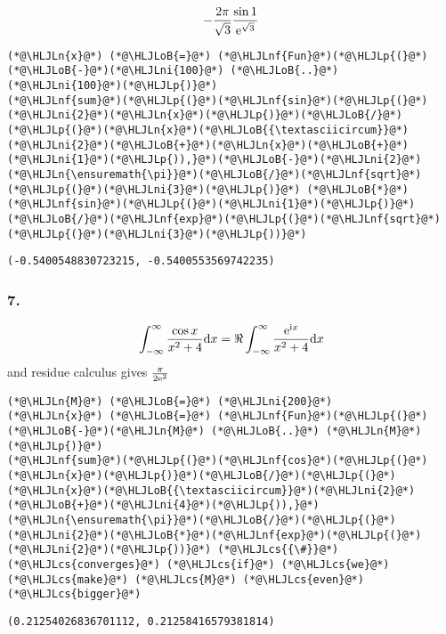 \documentclass[12pt,landscape]{article}
\newcommand{\HLJLn}[1]{#1}
\newcommand{\HLJLnf}[1]{\textcolor[RGB]{66,102,213}{#1}}
\newcommand{\HLJLni}[1]{\textcolor[RGB]{59,151,46}{#1}}
\newcommand{\HLJLoB}[1]{\textcolor[RGB]{102,102,102}{\textbf{#1}}}
\newcommand{\HLJLp}[1]{#1}
\newcommand{\HLJLcs}[1]{\textcolor[RGB]{153,153,119}{\textit{#1}}}
\def\D{ {\rm d} }
\def\I{ {\rm i} }
\def\E{ {\rm e} }
\def\dx{\D x}
\begin{document}
{\[
   -{2 \pi \over \sqrt 3} {\sin 1 \over \E^{\sqrt{3}}}
\]

\begin{lstlisting}
(*@\HLJLn{x}@*) (*@\HLJLoB{=}@*) (*@\HLJLnf{Fun}@*)(*@\HLJLp{(}@*)(*@\HLJLoB{-}@*)(*@\HLJLni{100}@*) (*@\HLJLoB{..}@*) (*@\HLJLni{100}@*)(*@\HLJLp{)}@*)
(*@\HLJLnf{sum}@*)(*@\HLJLp{(}@*)(*@\HLJLnf{sin}@*)(*@\HLJLp{(}@*)(*@\HLJLni{2}@*)(*@\HLJLn{x}@*)(*@\HLJLp{)}@*)(*@\HLJLoB{/}@*)(*@\HLJLp{(}@*)(*@\HLJLn{x}@*)(*@\HLJLoB{{\textasciicircum}}@*)(*@\HLJLni{2}@*)(*@\HLJLoB{+}@*)(*@\HLJLn{x}@*)(*@\HLJLoB{+}@*)(*@\HLJLni{1}@*)(*@\HLJLp{)),}@*)(*@\HLJLoB{-}@*)(*@\HLJLni{2}@*)(*@\HLJLn{\ensuremath{\pi}}@*)(*@\HLJLoB{/}@*)(*@\HLJLnf{sqrt}@*)(*@\HLJLp{(}@*)(*@\HLJLni{3}@*)(*@\HLJLp{)}@*) (*@\HLJLoB{*}@*) (*@\HLJLnf{sin}@*)(*@\HLJLp{(}@*)(*@\HLJLni{1}@*)(*@\HLJLp{)}@*)(*@\HLJLoB{/}@*)(*@\HLJLnf{exp}@*)(*@\HLJLp{(}@*)(*@\HLJLnf{sqrt}@*)(*@\HLJLp{(}@*)(*@\HLJLni{3}@*)(*@\HLJLp{))}@*)
\end{lstlisting}

\begin{lstlisting}
(-0.5400548830723215, -0.5400553569742235)
\end{lstlisting}


\subsubsection{7.}
\[
	\int_{-\infty}^\infty    {\cos x \over x^2 + 4} \dx = \Re 	\int_{-\infty}^\infty    {\E^{\I x}\over x^2 + 4} \dx
\]
and residue calculus gives ${\pi \over 2 \E^2}$


\begin{lstlisting}
(*@\HLJLn{M}@*) (*@\HLJLoB{=}@*) (*@\HLJLni{200}@*)
(*@\HLJLn{x}@*) (*@\HLJLoB{=}@*) (*@\HLJLnf{Fun}@*)(*@\HLJLp{(}@*)(*@\HLJLoB{-}@*)(*@\HLJLn{M}@*) (*@\HLJLoB{..}@*) (*@\HLJLn{M}@*)(*@\HLJLp{)}@*)
(*@\HLJLnf{sum}@*)(*@\HLJLp{(}@*)(*@\HLJLnf{cos}@*)(*@\HLJLp{(}@*)(*@\HLJLn{x}@*)(*@\HLJLp{)}@*)(*@\HLJLoB{/}@*)(*@\HLJLp{(}@*)(*@\HLJLn{x}@*)(*@\HLJLoB{{\textasciicircum}}@*)(*@\HLJLni{2}@*)(*@\HLJLoB{+}@*)(*@\HLJLni{4}@*)(*@\HLJLp{)),}@*)(*@\HLJLn{\ensuremath{\pi}}@*)(*@\HLJLoB{/}@*)(*@\HLJLp{(}@*)(*@\HLJLni{2}@*)(*@\HLJLoB{*}@*)(*@\HLJLnf{exp}@*)(*@\HLJLp{(}@*)(*@\HLJLni{2}@*)(*@\HLJLp{))}@*) (*@\HLJLcs{{\#}}@*) (*@\HLJLcs{converges}@*) (*@\HLJLcs{if}@*) (*@\HLJLcs{we}@*) (*@\HLJLcs{make}@*) (*@\HLJLcs{M}@*) (*@\HLJLcs{even}@*) (*@\HLJLcs{bigger}@*)
\end{lstlisting}

\begin{lstlisting}
(0.21254026836701112, 0.21258416579381814)
\end{lstlisting}


}
\end{document}
